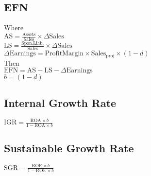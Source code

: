 \subsection*{EFN}
Where \\
$\mathrm{AS} = \frac{\mathrm{Assets}}{\mathrm{Sales}}\times\Delta\mathrm{Sales}$ \\
$\mathrm{LS} = \frac{\mathrm{Spon. Liab.}}{\mathrm{Sales}}\times\Delta\mathrm{Sales}$ \\
$\Delta\mathrm{Earnings} = \mathrm{Profit Margin}\times\mathrm{Sales}_{\mathrm{proj}}\times\left(1 - d\right)$ \\
Then \\
$\mathrm{EFN} = \mathrm{AS} - \mathrm{LS} - \Delta\mathrm{Earnings}$ \\
$b = (1 - d)$
\subsection*{Internal Growth Rate}
$\mathrm{IGR} = \frac{\mathrm{ROA}\times b}{1-\mathrm{ROA}\times b}$
\subsection*{Sustainable Growth Rate}
$\mathrm{SGR} = \frac{\mathrm{ROE}\times b}{1-\mathrm{ROE}\times b}$

